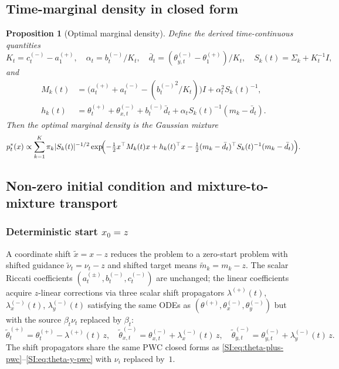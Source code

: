 \documentclass[11pt,onecolumn]{article}
\newtheorem{proposition}[theorem]{Proposition}
\begin{document}
\subsection{Time-marginal density in closed form}
\label{SI:quad:density}

\begin{proposition}[Optimal marginal density]
\label{prop:marginal}
Define the derived time-continuous quantities
\begin{equation}
  K_t = c_t^{(-)} - a_1^{(+)},
  \quad
  \alpha_t = b_t^{(-)}/K_t,
  \quad
  \bar d_t = (\theta_{y,t}^{(-)} - \theta_1^{(+)})/K_t,
  \quad
  S_k(t) = \Sigma_k + K_t^{-1}I,
  \label{SI:eq:derived-Kt}
\end{equation}
and
\begin{align}
  M_k(t)
  &= \bigl(a_t^{(+)}+a_t^{(-)}-({b_t^{(-)}}^2/K_t)\bigr)I
     + \alpha_t^2 S_k(t)^{-1},
  \label{SI:eq:Mk}\\
  h_k(t)
  &= \theta_t^{(+)} + \theta_{x,t}^{(-)}
     + b_t^{(-)}\bar d_t
     + \alpha_t S_k(t)^{-1}(m_k-\bar d_t).
  \label{SI:eq:hk}
\end{align}
Then the optimal marginal density is the Gaussian mixture
\begin{equation}
  p_t^{*}(x) \propto
  \sum_{k=1}^K \pi_k |S_k(t)|^{-1/2}
  \exp\!\Bigl(
    -\tfrac{1}{2}x^\top M_k(t)x + h_k(t)^\top x
    - \tfrac{1}{2}(m_k-\bar d_t)^\top S_k(t)^{-1}(m_k-\bar d_t)
  \Bigr).
  \label{SI:eq:p-star-gm}
\end{equation}
\end{proposition}

\subsection{Non-zero initial condition and mixture-to-mixture transport}
\label{SI:quad:nonzero-IC}

\subsubsection{Deterministic start $x_0=z$}
A coordinate shift $\tilde x = x-z$ reduces the problem to a zero-start
problem with shifted guidance $\tilde\nu_t = \nu_t - z$ and shifted
target means $\tilde m_k = m_k - z$.
The scalar Riccati coefficients
$(a_t^{(\pm)}, b_t^{(-)}, c_t^{(-)})$ are unchanged; the linear
coefficients acquire $z$-linear corrections via three scalar shift
propagators $\lambda^{(+)}(t)$, $\lambda_x^{(-)}(t)$,
$\lambda_y^{(-)}(t)$ satisfying the same ODEs as
$(\theta^{(+)},\theta_x^{(-)},\theta_y^{(-)})$
but with the source $\beta_t\nu_t$ replaced by $\beta_t$:
\begin{equation}
  \tilde\theta_t^{(+)} = \theta_t^{(+)} - \lambda^{(+)}(t)\,z,
  \quad
  \tilde\theta_{x,t}^{(-)} = \theta_{x,t}^{(-)} + \lambda_x^{(-)}(t)\,z,
  \quad
  \tilde\theta_{y,t}^{(-)} = \theta_{y,t}^{(-)} + \lambda_y^{(-)}(t)\,z.
  \label{SI:eq:theta-shifted}
\end{equation}
The shift propagators share the same PWC closed forms as
\eqref{SI:eq:theta-plus-pwc}--\eqref{SI:eq:theta-y-pwc}
with $\nu_i$ replaced by~$1$.
\end{document}
